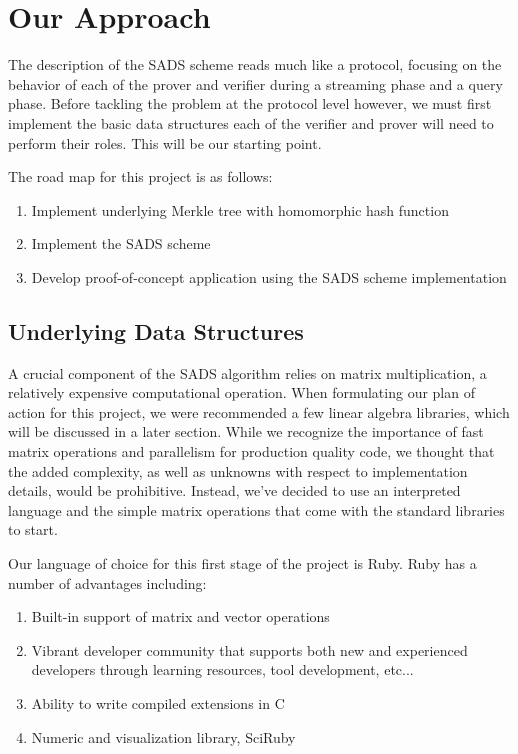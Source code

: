\documentclass[11pt, letterpaper, oneside]{article}
\begin{document}
	\section{Our Approach}
	
	The description of the SADS scheme reads much like a protocol, focusing on the behavior of each of the prover and verifier during a streaming phase and a query phase.
	Before tackling the problem at the protocol level however, we must first implement the basic data structures each of the verifier and prover will need to perform their roles.
	This will be our starting point.

	The road map for this project is as follows:
	\begin{enumerate}
	\item Implement underlying Merkle tree with homomorphic hash function
	\item Implement the SADS scheme
	\item Develop proof-of-concept application using the SADS scheme implementation
	\end{enumerate}

	\subsection{Underlying Data Structures}

	A crucial component of the SADS algorithm relies on matrix multiplication, a relatively expensive computational operation.
	When formulating our plan of action for this project, we were recommended a few linear algebra libraries, which will be discussed in a later section.
	While we recognize the importance of fast matrix operations and parallelism for production quality code, we thought that the added complexity, as well as unknowns with respect to implementation details, would be prohibitive.
	Instead, we've decided to use an interpreted language and the simple matrix operations that come with the standard libraries to start.

	Our language of choice for this first stage of the project is Ruby. Ruby has a number of advantages including:

	\begin{enumerate}
	\item Built-in support of matrix and vector operations
	\item Vibrant developer community that supports both new and experienced developers through learning resources, tool development, etc...
	\item Ability to write compiled extensions in C
	\item Numeric and visualization library, SciRuby
	\end{enumerate}
\end{document}
